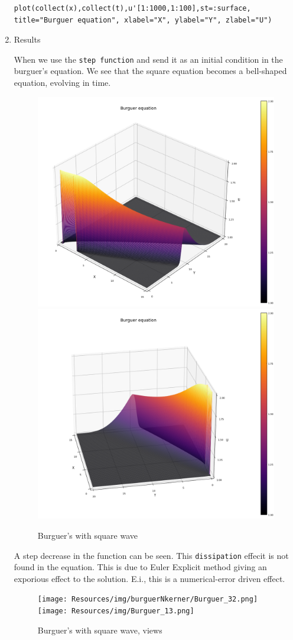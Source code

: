 \documentclass[11pt]{article}
\begin{document}
\begin{enumerate}
\begin{verbatim}
plot(collect(x),collect(t),u'[1:1000,1:100],st=:surface, title="Burguer equation", xlabel="X", ylabel="Y", zlabel="U")
\end{verbatim}

\item Results
\label{sec:orgba78843}

When we use the \texttt{step function} and send it as an initial condition in the
burguer's equation. We see that the square equation becomes a bell-shaped
equation, evolving in time.

\begin{figure}[!htb]
  \centering
  \caption{\label{fig:burguer-square} Burguer's with square wave}
  \includegraphics[width=0.45\linewidth]{Resources/img/Burguer.png}
  \includegraphics[width=0.45\linewidth]{Resources/img/Burguer2.png}
  \\  %
\end{figure}

A step decrease in the function can be seen. This \texttt{dissipation} effecit is not found in
the equation. This is due to Euler Explicit method giving an exporious effect to
the solution. E.i., this is a numerical-error driven effect.

\begin{figure}[!htb]
  \centering
  \caption{\label{fig:burguer-square} Burguer's with square wave, views}
  \texttt{[image: Resources/img/burguerNkerner/Burguer\_32.png]}
  \texttt{[image: Resources/img/Burguer\_13.png]}
  \\  %
\end{figure}
\end{enumerate}
\end{document}
